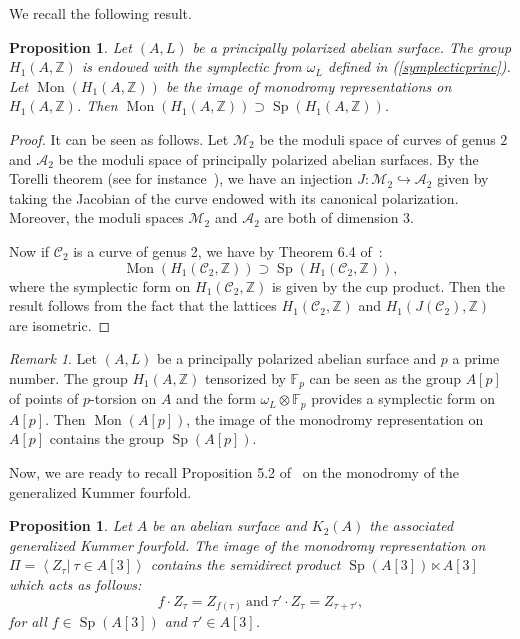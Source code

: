 \documentclass{alggeom}
\DeclareMathOperator{\Sp}{Sp}
\DeclareMathOperator{\Mon}{Mon}
\newcommand{\defIs}{\vcentcolon=}
\newcommand{\Z}{\mathbb{Z}}
\theoremstyle{plain}
\newtheorem{prop}[theorem]{Proposition}
\theoremstyle{definition}
\theoremstyle{remark}
\newtheorem{rmk}[theorem]{Remark}
\begin{document}
We recall the following result. 
\begin{prop}
Let $(A,L)$ be a principally polarized abelian surface. The group $H_1(A,\Z)$ is endowed with the symplectic from $\omega_L$ defined in (\ref{symplecticprinc}). Let $\Mon (H_1(A,\Z))$ be the image of monodromy representations on $H_1(A,\Z)$.
Then $\Mon (H_1(A,\Z))\supset\Sp(H_1(A,\Z))$.
\end{prop}
\begin{proof}
It can be seen as follows.
Let $\mathcal{M}_2$ be the moduli space of curves of genus $2$ and $\mathcal{A}_2$ be the moduli space of principally polarized abelian surfaces.
By the Torelli theorem (see for instance~\cite[Theorem 12.1]{Milne}), we have an injection $J:\mathcal{M}_2\hookrightarrow \mathcal{A}_2$ given by taking the Jacobian of the curve endowed with its canonical polarization. Moreover, the moduli spaces $\mathcal{M}_2$ and $\mathcal{A}_2$ are both of dimension 3. 

Now if $\mathscr{C}_2$ is a curve of genus 2, we have by Theorem 6.4 of~\cite{Farb}: 
$$\Mon (H_1(\mathscr{C}_2,\Z))\supset \Sp(H_1(\mathscr{C}_2,\Z)),$$
where the symplectic form on $H_1(\mathscr{C}_2,\Z)$ is given by the cup product. 
Then the result follows from the fact that the lattices $H_1(\mathscr{C}_2,\Z)$ and $H_1(J(\mathscr{C}_2),\Z)$ are isometric.
\end{proof}
\begin{rmk}\label{SPA2}
Let $(A,L)$ be a principally polarized abelian surface and $p$ a prime number. The group $H_1(A,\Z)$ tensorized by $\mathbb{F}_p$ can be seen as the group $A[p]$ of points of $p$-torsion on $A$ and the form $\omega_L\otimes\mathbb{F}_p$ provides a symplectic form on $A[p]$. Then $\Mon (A[p])$, the image of the monodromy representation on $A[p]$ contains the group $\Sp(A[p])$. 
\end{rmk}
Now, we are ready to recall Proposition 5.2 of~\cite{Hassett} on the monodromy of the generalized Kummer fourfold.
\begin{prop}\label{Hassettmonodromy}
Let $A$ be an abelian surface and $K_2(A)$ the associated generalized Kummer fourfold. 
The image of the monodromy representation on $\Pi=\left\langle\left. Z_\tau\right|\ \tau\in A[3]\right\rangle$ contains the semidirect product
$\Sp(A[3])\ltimes A[3]$ which acts as follows:
$$f\cdot Z_\tau= Z_{f(\tau)}\ \text{and}\ \tau'\cdot Z_\tau= Z_{\tau+\tau'},$$
for all $f\in \Sp(A[3])$ and $\tau'\in A[3]$.
\end{prop}
\end{document}
